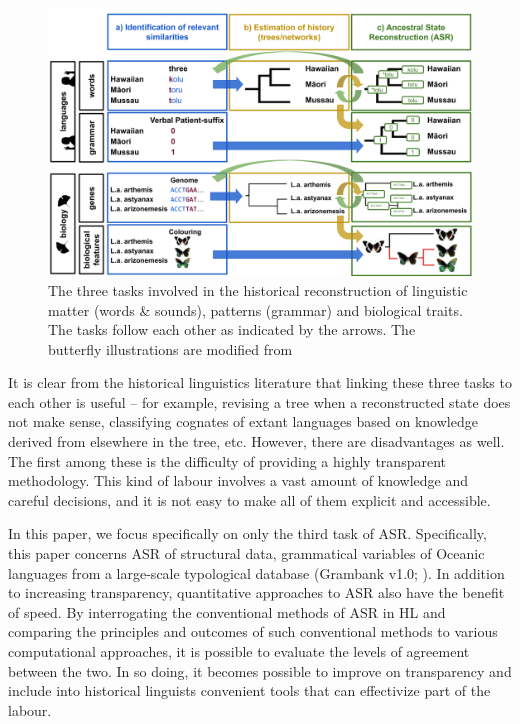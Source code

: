 \documentclass[12pt,letterpaper]{article}
\begin{document}
\begin{figure}
\centering
\includegraphics[width=22cm]{illustrations/ASR_HL_explainer_ill.png}
\caption{The three tasks involved in the historical reconstruction of linguistic matter (words \& sounds), patterns (grammar) and biological traits. The tasks follow each other as indicated by the arrows. The butterfly illustrations are modified from \citet{savage2009single}}
\label{fig:HL_tasks}
\end{figure}

It is clear from the historical linguistics literature that linking these three tasks to each other is useful -- for example, revising a tree when a reconstructed state does not make sense, classifying cognates of extant languages based on knowledge derived from elsewhere in the tree, etc. However, there are disadvantages as well. The first among these is the difficulty of providing a highly transparent methodology. This kind of labour involves a vast amount of knowledge and careful decisions, and it is not easy to make all of them explicit and accessible. 

In this paper, we focus specifically on only the third task of ASR. Specifically, this paper concerns ASR of structural data, grammatical variables of Oceanic languages from a large-scale typological database (Grambank v1.0; \citealt{grambank_release}). In addition to increasing transparency, quantitative approaches to ASR also have the benefit of speed. By interrogating the conventional methods of ASR in HL and comparing the principles and outcomes of such conventional methods to various computational approaches, it is possible to evaluate the levels of agreement between the two. In so doing, it becomes possible to improve on transparency and include into historical linguists convenient tools that can effectivize part of the labour.
\end{document}
